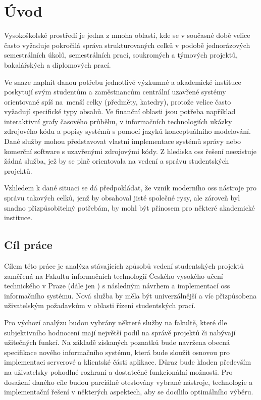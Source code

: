 \chapter{Úvod}

Vysokoškolské prostředí je jedna z mnoha oblastí, kde se v současné době velice často vyžaduje pokročilá správa strukturovaných celků v podobě jednorázových semestrálních úkolů, semestrálních prací, soukromých a týmových projektů, bakalářských a diplomových prací.

Ve snaze naplnit danou potřebu jednotlivé výzkumné a akademické instituce poskytují svým studentům a zaměstnancům centrální uzavřené systémy orientované spíš na~menší celky (předměty, katedry), protože velice často vyžadují specifické typy obsahů. Ve finanční oblasti jsou potřeba například interaktivní grafy časového průběhu, v informačních technologiích ukázky zdrojového kódu a popisy systémů s pomocí jazyků konceptuálního modelování. Dané služby mohou představovat vlastní implementace systémů správy nebo komerční software s uzavřenými zdrojovými kódy. Z hlediska \gls{oss} řešení neexistuje žádná služba, jež by se plně orientovala na vedení a správu studentských projektů.

Vzhledem k dané situaci se dá předpokládat, že vznik moderního \gls{oss} nástroje pro správu takových celků, jenž by obsahoval jisté společné rysy, ale zároveň byl snadno přizpůsobitelný potřebám, by mohl být přínosem pro některé akademické instituce.



\clearpage
\section{Cíl práce}

Cílem této práce je analýza stávajících způsobů vedení studentských projektů zaměřená na Fakultu informačních technologií Českého vysokého učení technického v Praze (dále jen  ) s následným návrhem a implementací \gls{oss} informačního systému. Nová služba by měla být univerzálnější a víc přizpůsobena uživatelským požadavkům v oblasti řízení studentských prací.

Pro výchozí analýzu budou vybrány některé služby na fakultě, které dle subjektivního hodnocení mají největší podíl na správě projektů či nabývají užitečných funkcí. Na základě získaných poznatků bude navržena obecná specifikace nového informačního systému, která bude sloužit osnovou pro implementaci serverové a klientské části aplikace. Důraz bude kladen především na uživatelsky pohodlné rozhraní a dostatečné funkcionální možnosti. Pro dosažení daného cíle budou parciálně otestovány vybrané nástroje, technologie a implementační řešení v některých aspektech, aby se docílilo optimálního výběru.

